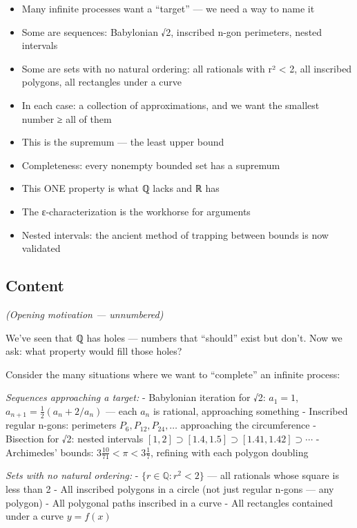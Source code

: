 \documentclass[
  10pt,
  letterpaper,
]{scrbook}
\providecommand{\tightlist}{%
  \setlength{\itemsep}{0pt}\setlength{\parskip}{0pt}}
\newcommand{\QQ}{\mathbb{Q}}
\begin{document}
\begin{itemize}
\tightlist
\item
  Many infinite processes want a ``target'' --- we need a way to name it
\item
  Some are sequences: Babylonian √2, inscribed n-gon perimeters, nested
  intervals
\item
  Some are sets with no natural ordering: all rationals with r²
  \textless{} 2, all inscribed polygons, all rectangles under a curve
\item
  In each case: a collection of approximations, and we want the smallest
  number ≥ all of them
\item
  This is the supremum --- the least upper bound
\item
  Completeness: every nonempty bounded set has a supremum
\item
  This ONE property is what ℚ lacks and ℝ has
\item
  The ε-characterization is the workhorse for arguments
\item
  Nested intervals: the ancient method of trapping between bounds is now
  validated
\end{itemize}

\subsection{Content}\label{content-2}

\emph{(Opening motivation --- unnumbered)}

We've seen that ℚ has holes --- numbers that ``should'' exist but don't.
Now we ask: what property would fill those holes?

Consider the many situations where we want to ``complete'' an infinite
process:

\emph{Sequences approaching a target:} - Babylonian iteration for √2:
\(a_1 = 1\), \(a_{n+1} = \frac{1}{2}(a_n + 2/a_n)\) --- each \(a_n\) is
rational, approaching something - Inscribed regular n-gons: perimeters
\(P_6, P_{12}, P_{24}, \ldots\) approaching the circumference -
Bisection for √2: nested intervals
\([1, 2] \supset [1.4, 1.5] \supset [1.41, 1.42] \supset \cdots\) -
Archimedes' bounds: \(3\frac{10}{71} < \pi < 3\frac{1}{7}\), refining
with each polygon doubling

\emph{Sets with no natural ordering:} - \(\{r \in \QQ : r^2 < 2\}\) ---
all rationals whose square is less than 2 - All inscribed polygons in a
circle (not just regular n-gons --- any polygon) - All polygonal paths
inscribed in a curve - All rectangles contained under a curve
\(y = f(x)\)
\end{document}
